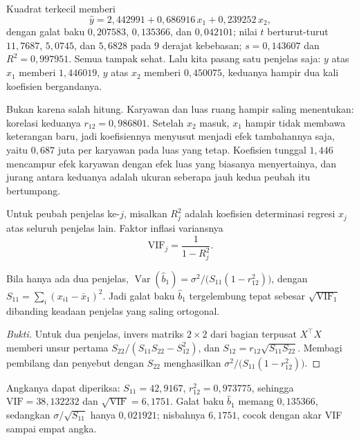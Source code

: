 Kuadrat terkecil memberi
\[
\hat y=2{,}442991+0{,}686916\,x_1+0{,}239252\,x_2,
\]
dengan galat baku $0{,}207583$, $0{,}135366$, dan $0{,}042101$; nilai $t$ berturut-turut
$11{,}7687$, $5{,}0745$, dan $5{,}6828$ pada $9$ derajat kebebasan; $s=0{,}143607$ dan
$R^2=0{,}997951$. Semua tampak sehat. Lalu kita pasang satu penjelas saja: $y$ atas $x_1$
memberi $1{,}446019$, $y$ atas $x_2$ memberi $0{,}450075$, keduanya hampir dua kali
koefisien bergandanya.

Bukan karena salah hitung. Karyawan dan luas ruang hampir saling menentukan: korelasi
keduanya $r_{12}=0{,}986801$. Setelah $x_2$ masuk, $x_1$ hampir tidak membawa
keterangan baru, jadi koefisiennya menyusut menjadi efek tambahannya saja, yaitu
$0{,}687$ juta per karyawan pada luas yang tetap. Koefisien tunggal $1{,}446$ mencampur
efek karyawan dengan efek luas yang biasanya menyertainya, dan jurang antara keduanya
adalah ukuran seberapa jauh kedua peubah itu bertumpang.

\begin{definisi}
Untuk peubah penjelas ke-$j$, misalkan $R_j^2$ adalah koefisien determinasi regresi
$x_j$ atas seluruh penjelas lain. Faktor inflasi variansnya
\[
\mathrm{VIF}_j=\frac{1}{1-R_j^2}.
\]
\end{definisi}


\begin{proposisi}
Bila hanya ada dua penjelas, $\operatorname{Var}(\hat b_1)=\sigma^2/\bigl(S_{11}
(1-r_{12}^2)\bigr)$, dengan $S_{11}=\sum_i(x_{i1}-\bar x_1)^2$. Jadi galat baku
$\hat b_1$ tergelembung tepat sebesar $\sqrt{\mathrm{VIF}_1}$ dibanding keadaan penjelas
yang saling ortogonal.
\end{proposisi}

\begin{proof}[Bukti]
Untuk dua penjelas, invers matriks $2\times2$ dari bagian terpusat $X^{\top}X$ memberi
unsur pertama $S_{22}/(S_{11}S_{22}-S_{12}^2)$, dan $S_{12}=r_{12}\sqrt{S_{11}S_{22}}$.
Membagi pembilang dan penyebut dengan $S_{22}$ menghasilkan
$\sigma^2/\bigl(S_{11}(1-r_{12}^2)\bigr)$.
\end{proof}

Angkanya dapat diperiksa: $S_{11}=42{,}9167$, $r_{12}^2=0{,}973775$, sehingga
$\mathrm{VIF}=38{,}132232$ dan $\sqrt{\mathrm{VIF}}=6{,}1751$. Galat baku $\hat b_1$
memang $0{,}135366$, sedangkan $\sigma/\sqrt{S_{11}}$ hanya $0{,}021921$; nisbahnya
$6{,}1751$, cocok dengan akar VIF sampai empat angka.

